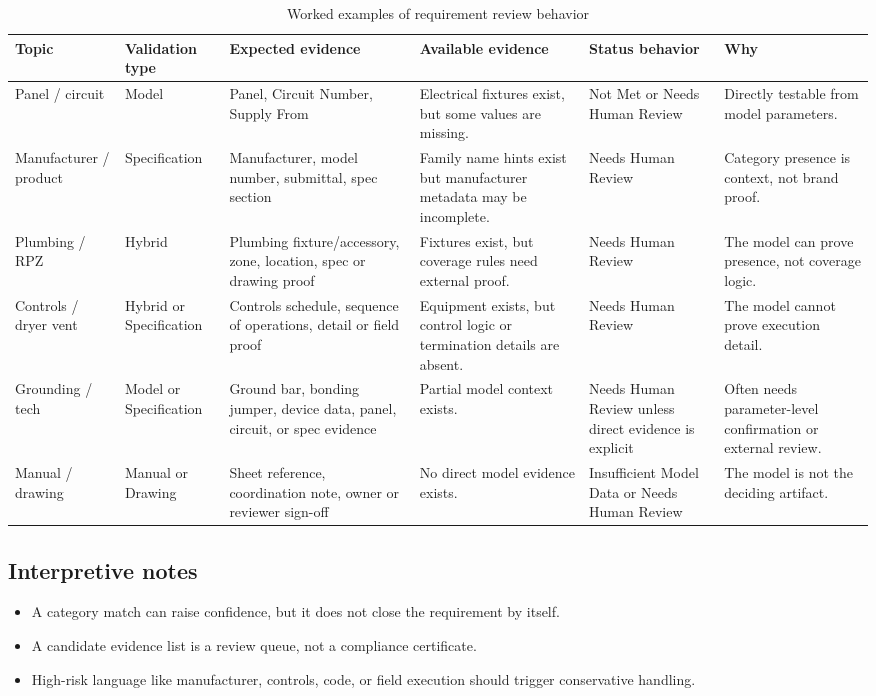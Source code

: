 \documentclass[10pt,letterpaper]{article}
\begin{document}
\small
\begin{longtable}{p{0.85in}p{1.0in}p{1.2in}p{1.2in}p{1.15in}p{1.0in}}
\caption{Worked examples of requirement review behavior}\\
\toprule
\textbf{Topic} & \textbf{Validation type} & \textbf{Expected evidence} & \textbf{Available evidence} & \textbf{Status behavior} & \textbf{Why} \\
\midrule
\endhead
Panel / circuit & Model & Panel, Circuit Number, Supply From & Electrical fixtures exist, but some values are missing. & Not Met or Needs Human Review & Directly testable from model parameters. \\
Manufacturer / product & Specification & Manufacturer, model number, submittal, spec section & Family name hints exist but manufacturer metadata may be incomplete. & Needs Human Review & Category presence is context, not brand proof. \\
Plumbing / RPZ & Hybrid & Plumbing fixture/accessory, zone, location, spec or drawing proof & Fixtures exist, but coverage rules need external proof. & Needs Human Review & The model can prove presence, not coverage logic. \\
Controls / dryer vent & Hybrid or Specification & Controls schedule, sequence of operations, detail or field proof & Equipment exists, but control logic or termination details are absent. & Needs Human Review & The model cannot prove execution detail. \\
Grounding / tech & Model or Specification & Ground bar, bonding jumper, device data, panel, circuit, or spec evidence & Partial model context exists. & Needs Human Review unless direct evidence is explicit & Often needs parameter-level confirmation or external review. \\
Manual / drawing & Manual or Drawing & Sheet reference, coordination note, owner or reviewer sign-off & No direct model evidence exists. & Insufficient Model Data or Needs Human Review & The model is not the deciding artifact. \\
\bottomrule
\end{longtable}
\normalsize

\subsection{Interpretive notes}

\begin{itemize}
  \item A category match can raise confidence, but it does not close the requirement by itself.
  \item A candidate evidence list is a review queue, not a compliance certificate.
  \item High-risk language like manufacturer, controls, code, or field execution should trigger conservative handling.
\end{itemize}
\end{document}
